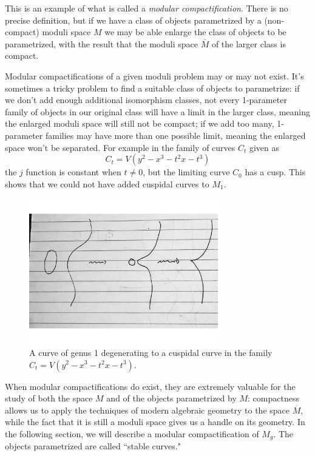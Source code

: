 This is an example of what is called a \emph{modular compactification}. There is no precise definition, but if we have a class of objects parametrized by a (non-compact) moduli space $M$ we may be able enlarge the class of objects to be parametrized, with the result that the moduli space $\overline M$ of the larger class is compact. 

Modular compactifications of a given moduli problem may or may not exist. It's sometimes a tricky problem to find a suitable class of objects to parametrize: if we don't add enough additional isomorphism classes, not every 1-parameter family of objects in our original class will have a limit in the larger class, meaning the enlarged moduli space will still not be compact; if we add too many,  1-parameter families may have more than one possible limit, meaning the enlarged space won't be separated. For example in the family
 of curves $C_t$ given as
$$
C_t = V(y^2 -x^3 - t^2x - t^3)
$$
the $j$ function is constant when $t\neq 0$, but  the limiting curve $C_0$ has a cusp. This shows that
we could not have added cuspidal curves to $M_1$.

\begin{figure}\label {Fig7.A}
\centerline {\includegraphics[height=2.5in]{"Fig7.A.pdf"}}
\caption{A curve of genus 1 degenerating to a cuspidal curve in the family $
C_t = V(y^2 -x^3 - t^2x - t^3)$.
}
\end{figure}


 When modular compactifications do exist, they are extremely valuable for the study of both the space $M$ and of the objects parametrized by $M$: compactness allows us to apply the techniques of modern algebraic geometry to the space $\overline M$, while the fact that it is still a moduli space gives us a handle on its geometry. In the following section, we will describe a modular compactification of $M_g$. The objects parametrized are called ``stable curves."


